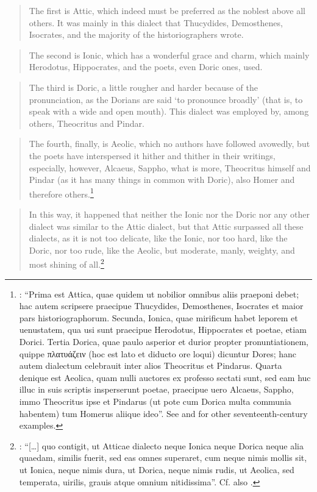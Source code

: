 \begin{quote}
The first is Attic, which indeed must be preferred as the noblest above all others. It was mainly in this dialect that Thucydides, Demosthenes, Isocrates, and the majority of the historiographers wrote.
\end{quote}

\begin{quote}
The second is Ionic, which has a wonderful grace and charm, which mainly Herodotus, Hippocrates, and the poets, even Doric ones, used.
\end{quote}

\begin{quote}
The third is Doric, a little rougher and harder because of the pronunciation, as the Dorians are said ‘to pronounce broadly’ (that is, to speak with a wide and open mouth). This dialect was employed by, among others, Theocritus and Pindar.
\end{quote}

\begin{quote}
The fourth, finally, is Aeolic, which no authors have followed avowedly, but the poets have interspersed it hither and thither in their writings, especially, however, Alcaeus, Sappho, what is more, Theocritus himself and Pindar (as it has many things in common with Doric), also Homer and therefore others.\footnote{\citet[2--3]{Merigon1621}: “Prima est Attica, quae quidem ut nobilior omnibus aliis praeponi debet; hac autem scripsere praecipue Thucydides, Demosthenes, Isocrates et maior pars historiographorum. Secunda, Ionica, quae mirificum habet leporem et uenustatem, qua usi sunt praecipue Herodotus, Hippocrates et poetae, etiam Dorici. Tertia Dorica, quae paulo asperior et durior propter pronuntiationem, quippe πλατυάζειν (hoc est lato et diducto ore loqui) dicuntur Dores; hanc autem dialectum celebrauit inter alios Theocritus et Pindarus. Quarta denique est Aeolica, quam nulli auctores ex professo sectati sunt, sed eam huc illuc in suis scriptis insperserunt poetae, praecipue uero Alcaeus, Sappho, immo Theocritus ipse et Pindarus (ut pote cum Dorica multa communia habentem) tum Homerus aliique ideo”. See \citet{Hoius1620} and \citet{Rhenius1626} for other seventeenth-century examples.}
\end{quote}

\begin{quote}
In this way, it happened that neither the Ionic nor the Doric nor any other dialect was similar to the Attic dialect, but that Attic surpassed all these dialects, as it is not too delicate, like the Ionic, nor too hard, like the Doric, nor too rude, like the Aeolic, but moderate, manly, weighty, and most shining of all.\footnote{\citet[6]{Georgi1729}: “[…] quo contigit, ut Atticae dialecto neque Ionica neque Dorica neque alia quaedam, similis fuerit, sed eas omnes superaret, cum neque nimis mollis sit, ut Ionica, neque nimis dura, ut Dorica, neque nimis rudis, ut Aeolica, sed temperata, uirilis, grauis atque omnium nitidissima”. Cf. also \citet[197--199]{Ries1786}.}
\end{quote}

